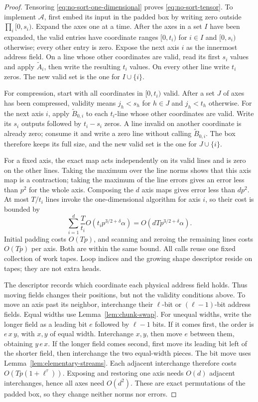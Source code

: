 \documentclass[11pt]{article}
\theoremstyle{definition}
\begin{document}
\begin{proof}
Tensoring \eqref{eq:no-sort-one-dimensional} proves
\eqref{eq:no-sort-tensor}. To implement $\mathcal A$, first embed its
input in the padded box by writing zero outside
$\prod_i[0,s_i)$. Expand the axes one at a time. After the axes in a set
$I$ have been expanded, the valid entries have coordinate ranges
$[0,t_i)$ for $i\in I$ and $[0,s_i)$ otherwise; every other entry is
zero. Expose the next axis $i$ as the innermost address field. On a line
whose other coordinates are valid, read its first $s_i$ values and apply
$\widetilde A_i$, then write the resulting $t_i$ values. On every other
line write $t_i$ zeros. The new valid set is the one for $I\cup\{i\}$.

For compression, start with all coordinates in $[0,t_i)$ valid.
After a set $J$ of axes has been compressed, validity means
$j_h<s_h$ for $h\in J$ and $j_h<t_h$ otherwise. For the next axis $i$,
apply $\widetilde B_{0,i}$ to each $t_i$-line whose other coordinates
are valid. Write its $s_i$ outputs followed by $t_i-s_i$ zeros.
A line invalid on another coordinate is already zero; consume it and
write a zero line without calling $\widetilde B_{0,i}$. The box therefore
keeps its full size, and the new valid set is the one for $J\cup\{i\}$.

For a fixed axis, the exact map acts independently on its valid lines
and is zero on the other lines. Taking the maximum over the line norms
shows that this axis map is a contraction; taking the maximum of the
line errors gives an error less than $p^2$ for the whole axis.
Composing the $d$ axis maps gives error less than $dp^2$.
At most $T/t_i$ lines invoke the one-dimensional algorithm for axis $i$,
so their cost is bounded by
\[
 \sum_{i=1}^d\frac{T}{t_i}
           O(t_i p^{3/2+\delta}\alpha)
   =O(dTp^{3/2+\delta}\alpha).
\]
Initial padding costs $O(Tp)$, and scanning and zeroing the remaining
lines costs $O(Tp)$ per axis. Both are within the same bound.
All calls reuse one fixed collection of work
tapes. Loop indices and the growing shape descriptor reside on tapes;
they are not extra heads.

The descriptor records which coordinate each physical address field
holds. Thus moving fields changes their positions, but not the validity
conditions above. To move an axis past its neighbor, interchange their
$\ell$-bit or $(\ell-1)$-bit address fields. Equal widths use
Lemma~\ref{lem:chunk-swap}. For unequal widths, write the longer field as
a leading bit $e$ followed by $\ell-1$ bits. If it comes first, the order
is $e\,x\,y$, with $x,y$ of equal width. Interchange $x,y$, then move $e$
between them, obtaining $y\,e\,x$. If the longer field comes second,
first move its leading bit left of the shorter field, then interchange
the two equal-width pieces. The bit move uses
Lemma~\ref{lem:elementary-streams}. Each adjacent interchange therefore
costs $O(Tp(1+\ell^\tau))$. Exposing and restoring one axis needs
$O(d)$ adjacent interchanges, hence all axes need $O(d^2)$. These are
exact permutations of the padded box, so they change neither norms nor
errors.


\end{proof}
\end{document}
